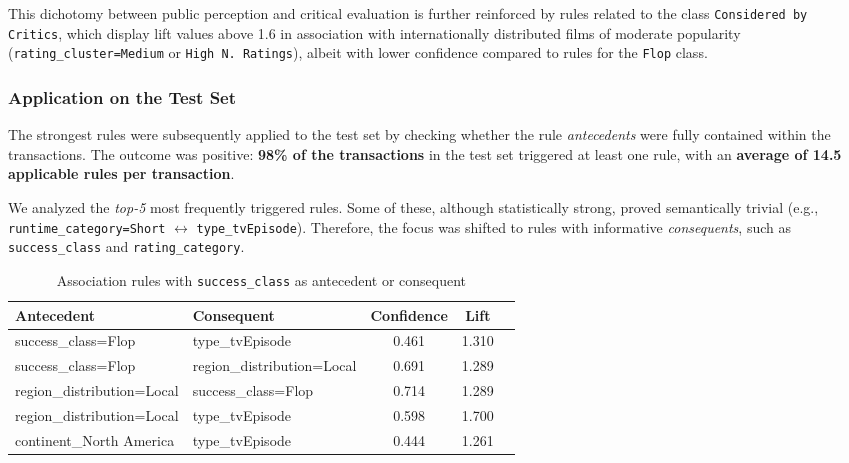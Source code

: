 \documentclass{article}
\begin{document}
This dichotomy between public perception and critical evaluation is further reinforced by rules related to the class \texttt{Considered by Critics}, which display lift values above 1.6 in association with internationally distributed films of moderate popularity (\texttt{rating\_cluster=Medium} or \texttt{High N. Ratings}), albeit with lower confidence compared to rules for the \texttt{Flop} class.


\subsubsection{Application on the Test Set}

The strongest rules were subsequently applied to the test set by checking whether the rule \textit{antecedents} were fully contained within the transactions. The outcome was positive: \textbf{98\% of the transactions} in the test set triggered at least one rule, with an \textbf{average of 14.5 applicable rules per transaction}.

We analyzed the \textit{top-5} most frequently triggered rules. Some of these, although statistically strong, proved semantically trivial (e.g., \texttt{runtime\_category=Short} $\leftrightarrow$ \texttt{type\_tvEpisode}). Therefore, the focus was shifted to rules with informative \textit{consequents}, such as \texttt{success\_class} and \texttt{rating\_category}.

\begin{table}[htbp]
\centering
\caption{Association rules with \texttt{success\_class} as antecedent or consequent}
\label{tab:flop_rules}
\begin{tabular}{|p{5cm}|p{4.5cm}|c|c|c|}
\hline
\textbf{Antecedent} & \textbf{Consequent} & \textbf{Confidence} & \textbf{Lift} \\
\hline
success\_class=Flop & type\_tvEpisode & 0.461 & 1.310  \\
\hline
success\_class=Flop & region\_distribution=Local & 0.691 & 1.289 \\
\hline
region\_distribution=Local & success\_class=Flop & 0.714 & 1.289  \\
\hline
region\_distribution=Local & type\_tvEpisode & 0.598 & 1.700  \\
\hline
continent\_North America & type\_tvEpisode & 0.444 & 1.261 \\
\hline
\end{tabular}
\end{table}
\end{document}
